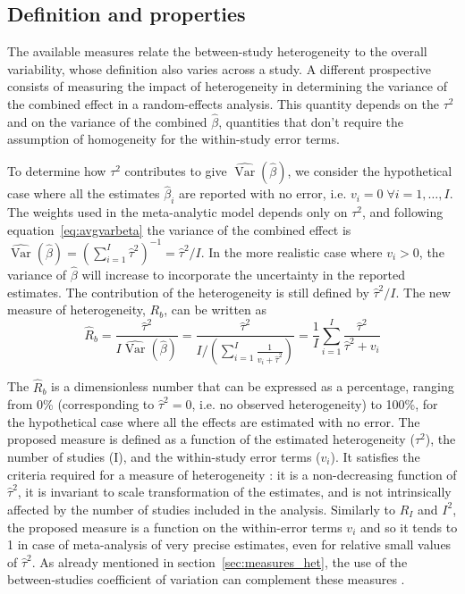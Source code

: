 \documentclass[11pt,a4paper,twoside,openany]{book}\usepackage{knitr}
\DeclareMathOperator{\Var}{Var}
\begin{document}
{\subsection{Definition and properties}

The available measures relate the between-study heterogeneity to the overall variability, whose definition also varies across a study. A different prospective consists of measuring the impact of heterogeneity in determining the variance of the combined effect in a random-effects analysis. This quantity depends on the $\tau^2$ and on the variance of the combined $\hat \beta$, quantities that don't require the assumption of homogeneity for the within-study error terms.

\noindent To determine how $\tau^2$ contributes to give $\widehat{\Var} \left(\hat \beta \right)$, we consider the hypothetical case where all the estimates $\hat \beta_i$ are reported with no error, i.e. $v_i = 0 \; \forall i = 1, \dots, I$. The weights used in the meta-analytic model depends only on $\tau^2$, and following equation~\ref{eq:avgvarbeta} the variance of the combined effect is $\widehat{\Var} \left(\hat \beta \right) = \left(\sum_{i = 1}^I \hat \tau^2 \right)^{-1} = \hat \tau^2/I$.
In the more realistic case where $v_i > 0$, the variance of $\hat \beta$ will increase to incorporate the uncertainty in the reported estimates. The contribution of the heterogeneity is still defined by $\hat \tau^2/I$. The new measure of heterogeneity, $R_b$, can be written as
\begin{equation}
\hat R_b = \frac{\hat \tau^2}{I \widehat{\Var} \left(\hat \beta \right)} = \frac{\hat \tau^2}{I/\left( \sum_{i = 1}^I \frac{1}{v_i + \hat \tau^2} \right)} = \frac{1}{I}\sum_{i = 1}^I \frac{\hat \tau^2}{\hat \tau^2 + v_i}
\label{eq:Rb}
\end{equation}

\noindent The $\hat R_b$ is a dimensionless number that can be expressed as a percentage, ranging from 0\% (corresponding to $\hat \tau^2 = 0$, i.e. no observed heterogeneity) to 100\%, for the hypothetical case where all the effects are estimated with no error. The proposed measure is defined as a function of the estimated heterogeneity ($\tau^2$), the number of studies (I), and the within-study error terms ($v_i$). It satisfies the criteria required for a measure of heterogeneity \citep{higgins2002quantifying}: it is a non-decreasing function of $\hat \tau^2$, it is invariant to scale transformation of the estimates, and is not intrinsically affected by the number of studies included in the analysis. Similarly to $\hat R_I$ and $I^2$, the proposed measure is a function on the within-error terms $v_i$ and so it tends to 1 in case of meta-analysis of very precise estimates, even for relative small values of $\hat \tau^2$. As already mentioned in section~\ref{sec:measures_het}, the use of the between-studies coefficient of variation can complement these measures \citep{takkouche1999evaluation}.

}
\end{document}
